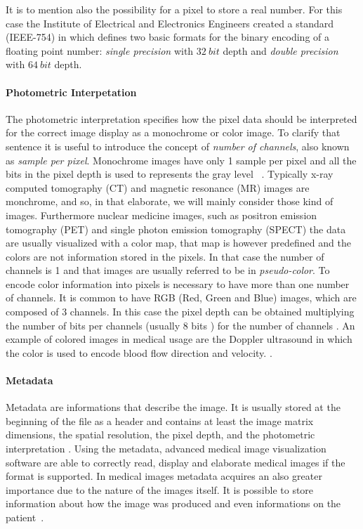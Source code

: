 \documentclass{standalone}
\begin{document}
It is to mention also the possibility for a pixel to store a real number. For this case the Institute of Electrical and Electronics Engineers created a standard (IEEE-754) in which defines two basic formats for the binary encoding of a floating point number: \textit{single precision} with $32 \ bit$ depth and \textit{double precision} with $64 \ bit$ depth.

\paragraph{Photometric Interpetation}
The photometric interpretation specifies how the pixel data should be interpreted for the correct image display as a monochrome or color image. To clarify that sentence it is useful to introduce the concept of \textit{number of channels}, also known as \textit{sample per pixel}. Monochrome images have only 1 sample per pixel and all the bits in the pixel depth is used to represents the gray level ~\cite{ART:Larobina}.
Typically x-ray computed tomography (CT) and magnetic resonance (MR) images are monchrome, and so, in that elaborate, we will mainly consider those kind of images.
Furthermore nuclear medicine images, such as positron emission tomography (PET) and single photon emission tomography (SPECT) the data are usually visualized with a color map, that map is however predefined and the colors are not information stored in the pixels. In that case the number of channels is 1 and that images are usually referred to be in \textit{pseudo-color}.
To encode color information into pixels is necessary to have more than one number of channels. It is common to have RGB (Red, Green and Blue) images, which are composed of 3 channels. In this case the pixel depth can be obtained multiplying the number of bits per channels (usually 8 bits \cite{Graphic_encyclopedia}) for the number of channels \cite{ART:Larobina}.
An example of colored images in medical usage are the Doppler ultrasound in which the color is used to encode blood flow direction and velocity. \cite{mastersthesis:Biondi}.


\paragraph{Metadata}
Metadata are informations that describe the image. It is usually stored at the beginning of the file as a header and contains at least the image matrix dimensions, the spatial resolution, the pixel depth, and the photometric interpretation \cite{ART:Larobina}.
Using the metadata, advanced medical image visualization software are able to correctly read, display and elaborate medical images if the format is supported.
In medical images metadata acquires an also greater importance due to the nature of the images itself. It is possible to store information about how the image was produced and even informations on the patient~\cite{mastersthesis:Biondi}.
\end{document}
